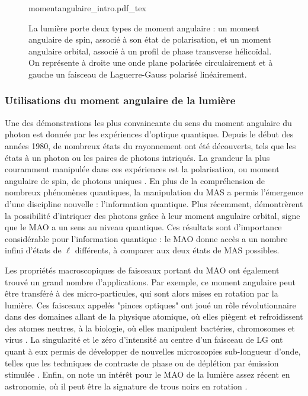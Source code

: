 \begin{figure}[!ht]
\centering
\def\svgwidth{\columnwidth}
{momentangulaire_intro.pdf_tex}
\caption{La lumière porte deux types de moment angulaire : un moment angulaire de spin, associé à son état de polarisation, et un moment angulaire orbital, associé à un profil de phase transverse hélicoïdal. On représente à droite une onde plane polarisée circulairement et à gauche un faisceau de Laguerre-Gauss polarisé linéairement.}
\label{Fig:Intro_MA}
\end{figure}

\subsubsection{Utilisations du moment angulaire de la lumière}
Une des démonstrations les plus convaincante du sens du moment angulaire du photon est donnée par les expériences d'optique quantique. Depuis le début des années 1980, de nombreux états du rayonnement ont été découverts, tels que les états à un photon ou les paires de photons intriqués. La grandeur la plus couramment manipulée dans ces expériences est la polarisation, ou moment angulaire de spin, de photons uniques . En plus de la compréhension de nombreux phénomènes quantiques, la manipulation du MAS a permis l'émergence d'une discipline nouvelle : l'information quantique. Plus récemment,  démontrèrent la possibilité d'intriquer des photons grâce à leur moment angulaire orbital, signe que le MAO a un sens au niveau quantique. Ces résultats sont d'importance considérable pour l'information quantique : le MAO donne accès a un nombre infini d'états de $\ell$ différents, à comparer aux deux états de MAS possibles.

Les propriétés macroscopiques de faisceaux portant du MAO ont également trouvé un grand nombre d'applications. Par exemple, ce moment angulaire peut être transféré à des micro-particules, qui sont alors mises en rotation par la lumière. Ces faisceaux appelés "pinces optiques" ont joué un rôle révolutionnaire dans des domaines allant de la physique atomique, où elles piègent et refroidissent des atomes neutres, à la biologie, où elles manipulent bactéries, chromosomes et virus . La singularité et le zéro d'intensité au centre d'un faisceau de LG ont quant à eux permis de développer de nouvelles microscopies sub-longueur d'onde, telles que les techniques de contraste de phase  ou de déplétion par émission stimulée . Enfin, on note un intérêt pour le MAO de la lumière assez récent en astronomie, où il peut être la signature de trous noirs en rotation .

